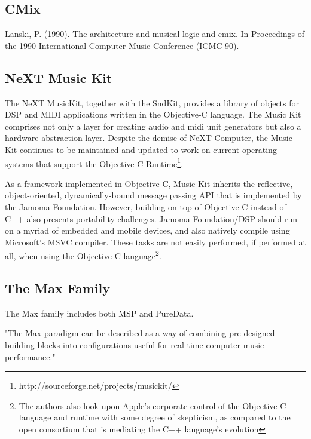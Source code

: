 \documentclass[twoside,10pt]{article}
\begin{document}

\subsection{CMix} %

Lanski, P. (1990). The architecture and musical logic and cmix.
In Proceedings of the 1990 International Computer Music
Conference (ICMC 90).


\subsection{NeXT Music Kit} %

The NeXT MusicKit, together with the SndKit, provides a library of objects for DSP and MIDI applications written in the Objective-C language\cite{Jaffe:1989,Jaffe:1991}.  The Music Kit comprises not only a layer for creating audio and midi unit generators but also a hardware abstraction layer.  Despite the demise of NeXT Computer, the Music Kit continues to be maintained and updated to work on current operating systems that support the Objective-C Runtime\footnote{http://sourceforge.net/projects/musickit/}.

As a framework implemented in Objective-C, Music Kit inherits the reflective, object-oriented, dynamically-bound message passing API that is implemented by the Jamoma Foundation.  However, building on top of Objective-C instead of C++ also presents portability challenges.  Jamoma Foundation/DSP should run on a myriad of embedded and mobile devices, and also natively compile using Microsoft's MSVC compiler.  These tasks are not easily performed, if performed at all, when using the Objective-C language\footnote{The authors also look upon Apple's corporate control of the Objective-C language and runtime with some degree of skepticism, as compared to the open consortium that is mediating the C++ language's evolution}.

\subsection{The Max Family} %

The Max family includes both MSP\cite{Zicarelli:1998} and PureData\cite{Puckette:1996}.

"The Max paradigm can be described as a way of combining pre-designed building blocks into configurations useful for real-time computer music performance."\cite{Puckette:2002_max_at_17}
\end{document}
